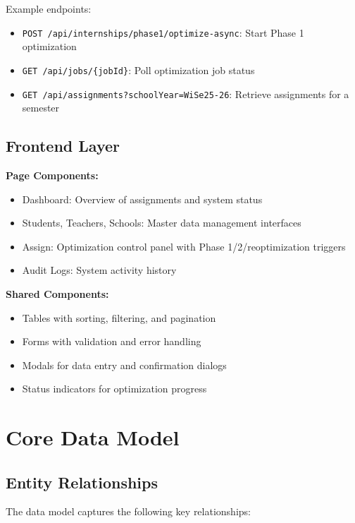 \documentclass[12pt,a4paper]{report}
\begin{document}
Example endpoints:
\begin{itemize}
    \item \texttt{POST /api/internships/phase1/optimize-async}: Start Phase 1 optimization
    \item \texttt{GET /api/jobs/\{jobId\}}: Poll optimization job status
    \item \texttt{GET /api/assignments?schoolYear=WiSe25-26}: Retrieve assignments for a semester
\end{itemize}

\subsection{Frontend Layer}

\textbf{Page Components:}
\begin{itemize}
    \item Dashboard: Overview of assignments and system status
    \item Students, Teachers, Schools: Master data management interfaces
    \item Assign: Optimization control panel with Phase 1/2/reoptimization triggers
    \item Audit Logs: System activity history
\end{itemize}

\textbf{Shared Components:}
\begin{itemize}
    \item Tables with sorting, filtering, and pagination
    \item Forms with validation and error handling
    \item Modals for data entry and confirmation dialogs
    \item Status indicators for optimization progress
\end{itemize}

\section{Core Data Model}

\subsection{Entity Relationships}

The data model captures the following key relationships:
\end{document}
